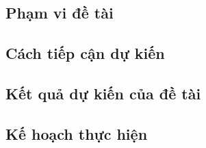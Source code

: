 \subsection{Phạm vi đề tài}

\subsection{Cách tiếp cận dự kiến}

\subsection{Kết quả dự kiến của đề tài}

\subsection{Kế hoạch thực hiện}
